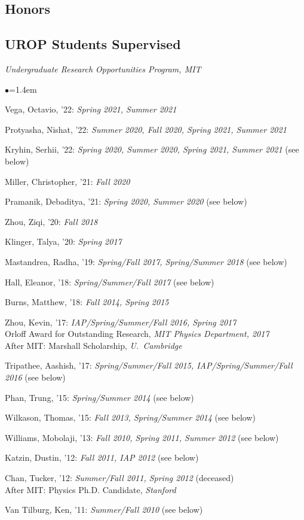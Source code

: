 \documentclass[11pt]{article}
\newcommand{\heading}[1]{\vspace{0in}\subsection*{#1} \vspace{.02in}}
\newcommand{\sh}{\phantom{.....}}
\newcommand{\bbl}{\begin{list}{$\bullet$}{\leftmargin=1.4em \itemsep=-1pt}}
\newcommand{\el}{\end{list}}
\begin{document}


\heading{Honors}



\newpage




\heading{UROP Students Supervised}
\vspace{-.1in}
\textit{Undergraduate Research Opportunities Program, MIT}

\bbl
\item Vega, Octavio, '22:  \textit{Spring 2021, Summer 2021}
\item Protyasha, Nishat, '22:  \textit{Summer 2020, Fall 2020, Spring 2021, Summer 2021}
\item Kryhin, Serhii, '22:   \textit{Spring 2020, Summer 2020, Spring 2021, Summer 2021} (see below)
\item Miller, Christopher, '21:  \textit{Fall 2020}
\item Pramanik, Debaditya, '21:  \textit{Spring 2020, Summer 2020} (see below)
\item Zhou, Ziqi, '20:  \textit{Fall 2018}
\item Klinger, Talya, '20:  \textit{Spring 2017}
\item Mastandrea, Radha, '19:  \textit{Spring/Fall 2017, Spring/Summer 2018} (see below)
\item Hall, Eleanor, '18:  \textit{Spring/Summer/Fall 2017} (see below)
\item Burns, Matthew, '18:  \textit{Fall 2014, Spring 2015}
\item Zhou, Kevin, '17:  \textit{IAP/Spring/Summer/Fall 2016, Spring 2017}
\\ \sh Orloff Award for Outstanding Research, \textit{MIT Physics Department, 2017}
\\ \sh After MIT:  Marshall Scholarship, \textit{U.~Cambridge}
\item Tripathee, Aashish, '17: \textit{Spring/Summer/Fall 2015, IAP/Spring/Summer/Fall 2016} (see below)
\item Phan, Trung, '15: \textit{Spring/Summer 2014} (see below)
\item Wilkason, Thomas, '15: \textit{Fall 2013, Spring/Summer 2014} (see below)
\item Williams, Mobolaji, '13: \textit{Fall 2010, Spring 2011, Summer 2012} (see below)
\item Katzin, Dustin, '12: \textit{Fall 2011, IAP 2012} (see below)
\item Chan, Tucker, '12: \textit{Summer/Fall 2011, Spring 2012}  (deceased)
\\ \sh After MIT:   Physics Ph.D. Candidate, \textit{Stanford}
\item Van Tilburg, Ken, '11:  \textit{Summer/Fall 2010} (see below)
\el
\end{document}
